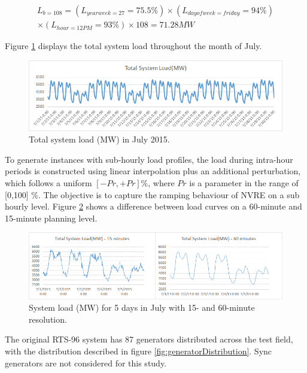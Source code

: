 \documentclass[12pt,LUDisStyle,twosided]{book}
\begin{document}
\begin{multline}
L_{b = 108} =  (L_{yearweek = 27} = 75.5\%) \times (L_{dayofweek = friday} = 94\%) 
\\ \times (L_{hour= 12 PM} = 93\%) \times 108 = 71.28MW
\end{multline}

Figure \ref{fig:totalSystemLoadJuly} displays the total system load throughout the month of July.

\begin{figure}[H] 
  \includegraphics[width=\textwidth,height=\textheight,keepaspectratio]{totalSystemLoadJuly.png}
  \caption{Total system load (MW) in July 2015.}
  \label{fig:totalSystemLoadJuly}
\end{figure}

To generate instances with sub-hourly load profiles, the load during intra-hour periods is constructed using linear interpolation plus an additional perturbation, which follows a uniform $[-Pr,+Pr]\%$, where $Pr$ is a parameter in the range of [0,100] \%. The objective is to capture the ramping behaviour of NVRE on a sub hourly level. Figure \ref{fig:perturbationDifference} shows a difference between load curves on a 60-minute and 15-minute planning level. 

\begin{figure}[H] 
  \includegraphics[width=\textwidth,height=\textheight,keepaspectratio]{perturbationDifference.png}
  \caption{System load (MW) for 5 days in July with 15- and 60-minute resolution.}
  \label{fig:perturbationDifference}
\end{figure}

The original RTS-96 system has 87 generators distributed across the test field, with the distribution described in figure \ref{fig:generatorDistribution}. Sync generators are not considered for this study.
\end{document}

